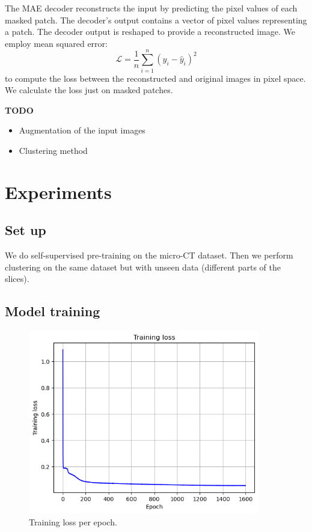 \documentclass[11pt,titlepage,openright]{book}
\begin{document}
The MAE decoder reconstructs the input by predicting the pixel values of each masked patch. The decoder's output contains a vector of pixel values representing a patch. The decoder output is reshaped to provide a reconstructed image. We employ mean squared error: 
\begin{equation}
        \mathcal{L} = \frac{1}{n} \sum_{i=1}^{n} (y_i - \hat{y}_i)^2
\end{equation}
to compute the loss between the reconstructed and original images in pixel space. We calculate the loss just on masked patches.

\textbf{TODO}
\begin{itemize}
    \item Augmentation of the input images
    \item Clustering method
\end{itemize}


\chapter{Experiments}
\section{Set up}
\label{experiments set up}

We do self-supervised pre-training on the micro-CT dataset. Then we perform clustering on the same dataset but with unseen data (different parts of the slices). 

\section{Model training}
\label{model training}

\begin{figure}[t]
  \begin{center}
    \includegraphics[width=0.9\textwidth]{Figures/loss.png}
  \end{center}
  \caption{Training loss per epoch.}
  \label{fig:training loss}
\end{figure}
\end{document}

